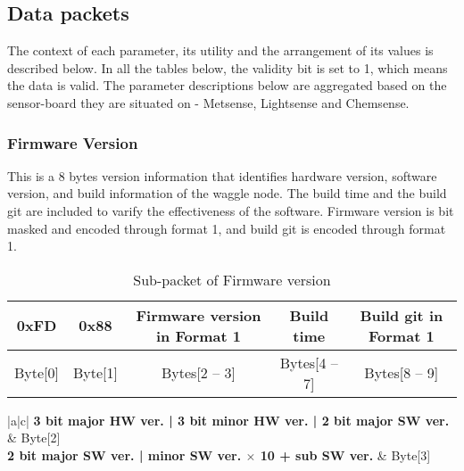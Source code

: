 \subsection{Data packets}
The context of each parameter, its utility and the arrangement of its values is described below. In all
the tables below, the validity bit is set to 1, which means the data is valid. The parameter descriptions
below are aggregated based on the sensor-board they are situated on -
Metsense, Lightsense and Chemsense.

\subsubsection{Firmware Version}
This is a 8 bytes version information that identifies hardware version, software version, and build information of the waggle node.
The build time and the build git are included to varify the effectiveness of the software.
Firmware version is bit masked and encoded through format 1, and build git is encoded through format 1.

\begin{table}[h!]
    \centering
    \caption{Sub-packet of Firmware version}
    \begin{tabular}{|c|c|c|c|c|}
        \hline
        \rowcolor{black!8}
        \textbf{0xFD} & \textbf{0x88} & \textbf{Firmware version in Format 1} & \textbf{Build time} & \textbf{Build git in Format 1} \\ \hline
        Byte[0] & Byte[1] & Bytes[2 -- 3] & Bytes[4 -- 7] & Bytes[8 -- 9]\\ \hline
    \end{tabular}
\end{table}


\begin{table}[h!]
    \centering
    \caption{Firmware version}
    \begin{tabular}{|a|c|}
        \hline
        \textbf{3 bit major HW ver. | 3 bit minor HW ver. | 2 bit major SW ver.} & Byte[2] \\ \hline
        \textbf{2 bit major SW ver. | minor SW ver. $\times$ 10 + sub SW ver.} & Byte[3]\\ \hline
    \end{tabular}
\end{table}
